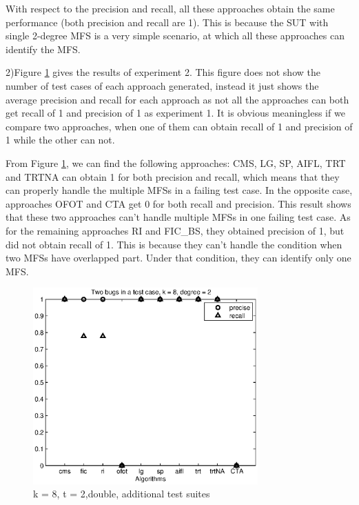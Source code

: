 \documentclass{sig-alternate-05-2015}
\begin{document}
{{{{With respect to the precision and recall, all these approaches obtain the same performance (both precision and recall are 1). This is because the SUT with single 2-degree MFS is a very simple scenario, at which all these approaches can identify the MFS.


2)Figure \ref{fig_double} gives the results of experiment 2. This figure does not show the number of test cases of each approach generated, instead it just shows the average precision and recall for each approach as not all the approaches can both get recall of 1 and precision of 1 as experiment 1. It is obvious meaningless if we compare two approaches, when one of them can obtain recall of 1 and precision of 1 while the other can not.

From Figure \ref{fig_double}, we can find the following approaches: CMS, LG, SP, AIFL, TRT and TRTNA can obtain 1 for both precision and recall, which means that they can properly handle the multiple MFSs in a failing test case. In the opposite case, approaches OFOT and CTA get 0 for both recall and precision. This result shows that these two approaches can't handle multiple MFSs in one failing test case. As for the remaining approaches RI and FIC\_BS, they obtained precision of 1, but did not obtain recall of 1. This is because they can't handle the condition when two MFSs have overlapped part. Under that condition, they can identify only one MFS.

%

\begin{figure}
 \centering
 \includegraphics[width=3.4in]{d-8-2.eps}
 \caption{k = 8, t = 2,double, additional test suites}
 \label{fig_double}
\end{figure}

}}}}
\end{document}
